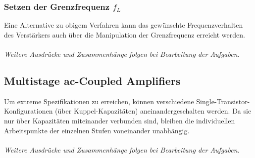 \documentclass[11pt,a4paper,titlepage]{article}
\begin{document}
 \subsubsection{Setzen der Grenzfrequenz $f_L$}
 Eine Alternative zu obigem Verfahren kann das gewünschte Frequenzverhalten des Verstärkers auch über die Manipulation der Grenzfrequenz erreicht werden.\\
 \\
 \textit{Weitere Ausdrücke und Zusammenhänge folgen bei Bearbeitung der Aufgaben.}
 
 \subsection{Multistage ac-Coupled Amplifiers}
 Um extreme Spezifikationen zu erreichen, können verschiedene Single-Transistor-Konfigurationen (über Kuppel-Kapazitäten) aneinandergeschalten werden. Da sie nur über Kapazitäten miteinander verbunden sind, bleiben die individuellen Arbeitspunkte der einzelnen Stufen voneinander unabhängig.\\
 \\
 \textit{Weitere Ausdrücke und Zusammenhänge folgen bei Bearbeitung der Aufgaben.}
\end{document}
